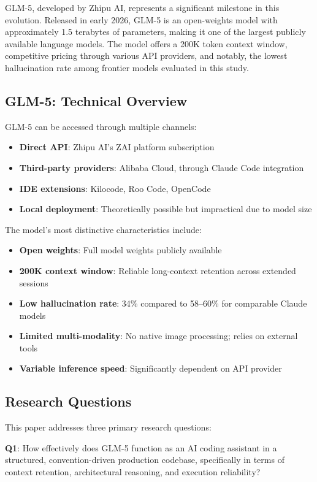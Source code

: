 \documentclass[conference]{IEEEtran}
\begin{document}
GLM-5, developed by Zhipu AI, represents a significant milestone in this evolution. Released in early 2026, GLM-5 is an open-weights model with approximately 1.5 terabytes of parameters, making it one of the largest publicly available language models. The model offers a 200K token context window, competitive pricing through various API providers, and notably, the lowest hallucination rate among frontier models evaluated in this study.

\subsection{GLM-5: Technical Overview}
GLM-5 can be accessed through multiple channels:
\begin{itemize}
    \item \textbf{Direct API}: Zhipu AI's ZAI platform subscription
    \item \textbf{Third-party providers}: Alibaba Cloud, through Claude Code integration
    \item \textbf{IDE extensions}: Kilocode, Roo Code, OpenCode
    \item \textbf{Local deployment}: Theoretically possible but impractical due to model size
\end{itemize}

The model's most distinctive characteristics include:
\begin{itemize}
    \item \textbf{Open weights}: Full model weights publicly available
    \item \textbf{200K context window}: Reliable long-context retention across extended sessions
    \item \textbf{Low hallucination rate}: 34\% compared to 58--60\% for comparable Claude models
    \item \textbf{Limited multi-modality}: No native image processing; relies on external tools
    \item \textbf{Variable inference speed}: Significantly dependent on API provider
\end{itemize}

\subsection{Research Questions}
This paper addresses three primary research questions:

\textbf{Q1}: How effectively does GLM-5 function as an AI coding assistant in a structured, convention-driven production codebase, specifically in terms of context retention, architectural reasoning, and execution reliability?
\end{document}

